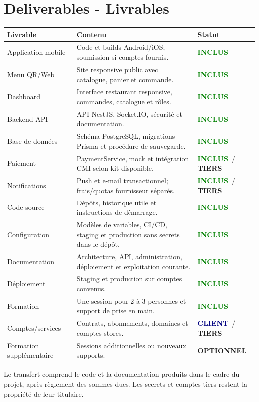 \documentclass[10pt,a4paper]{article}
\newcommand{\tagbox}[2]{\colorbox{#1!14}{\textcolor{#1}{\textbf{\scriptsize #2}}}}
\newcommand{\included}{\tagbox{green}{INCLUS}}
\newcommand{\optional}{\tagbox{amber}{OPTIONNEL}}
\newcommand{\client}{\tagbox{navy}{CLIENT}}
\newcommand{\thirdparty}{\tagbox{terracotta}{TIERS}}
\begin{document}
\section{Deliverables - Livrables}
\begin{longtable}{@{}L{4.2cm}L{8.7cm}L{2.5cm}@{}}
\toprule
\textbf{Livrable} & \textbf{Contenu} & \textbf{Statut} \\
\midrule
\endhead
Application mobile & Code et builds Android/iOS; soumission si comptes fournis. & \included \\
Menu QR/Web & Site responsive public avec catalogue, panier et commande. & \included \\
Dashboard & Interface restaurant responsive, commandes, catalogue et rôles. & \included \\
Backend API & API NestJS, Socket.IO, sécurité et documentation. & \included \\
Base de données & Schéma PostgreSQL, migrations Prisma et procédure de sauvegarde. & \included \\
Paiement & PaymentService, mock et intégration CMI selon kit disponible. & \included\ / \thirdparty \\
Notifications & Push et e-mail transactionnel; frais/quotas fournisseur séparés. & \included\ / \thirdparty \\
Code source & Dépôts, historique utile et instructions de démarrage. & \included \\
Configuration & Modèles de variables, CI/CD, staging et production sans secrets dans le dépôt. & \included \\
Documentation & Architecture, API, administration, déploiement et exploitation courante. & \included \\
Déploiement & Staging et production sur comptes convenus. & \included \\
Formation & Une session pour 2 à 3 personnes et support de prise en main. & \included \\
Comptes/services & Contrats, abonnements, domaines et comptes stores. & \client\ / \thirdparty \\
Formation supplémentaire & Sessions additionnelles ou nouveaux supports. & \optional \\
\bottomrule
\end{longtable}
Le transfert comprend le code et la documentation produits dans le cadre du projet, après règlement des sommes dues. Les secrets et comptes tiers restent la propriété de leur titulaire.
\end{document}
